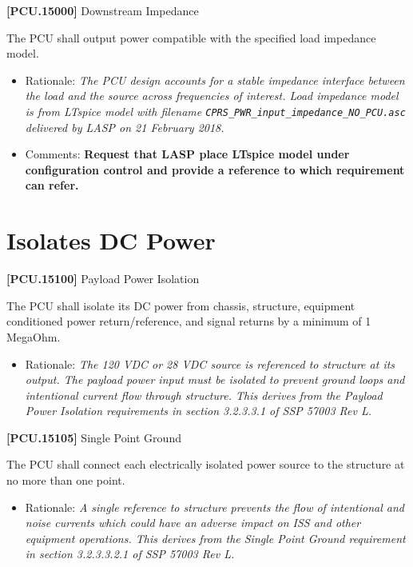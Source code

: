 \documentclass[12pt,oneside,oldfontcommands]{memoir}
\begin{document}
\textbf{[PCU.15000]} Downstream Impedance

The \gls{PCU} shall output power compatible with the specified load impedance model.

\begin{itemize}
\item{} Rationale: \emph{The PCU design accounts for a stable impedance interface between the load and the source across frequencies of interest. Load impedance model is from LTspice model with filename \texttt{CPRS\_PWR\_input\_impedance\_NO\_PCU.asc} delivered by LASP on 21 February 2018.}

\item{} Comments: \textbf{Request that LASP place LTspice model under configuration control and provide a reference to which requirement can refer.}

\end{itemize}

\section{Isolates DC Power}
\label{isolatesdcpower}

\textbf{[PCU.15100]} Payload Power Isolation

The \gls{PCU} shall isolate its DC power from chassis, structure, equipment conditioned power return\slash reference, and signal returns by a minimum of 1 MegaOhm.

\begin{itemize}
\item{} Rationale: \emph{The 120 VDC or 28 VDC source is referenced to structure at its output. The payload power input must be isolated to prevent ground loops and intentional current flow through structure. This derives from the Payload Power Isolation requirements in section 3.2.3.3.1 of SSP 57003 Rev L.}

\end{itemize}

\textbf{[PCU.15105]} Single Point Ground

The \gls{PCU} shall connect each electrically isolated power source to the structure at no more than one point.

\begin{itemize}
\item{} Rationale: \emph{A single reference to structure prevents the flow of intentional and noise currents which could have an adverse impact on ISS and other equipment operations. This derives from the Single Point Ground requirement in section 3.2.3.3.2.1 of SSP 57003 Rev L.}

\end{itemize}
\end{document}
